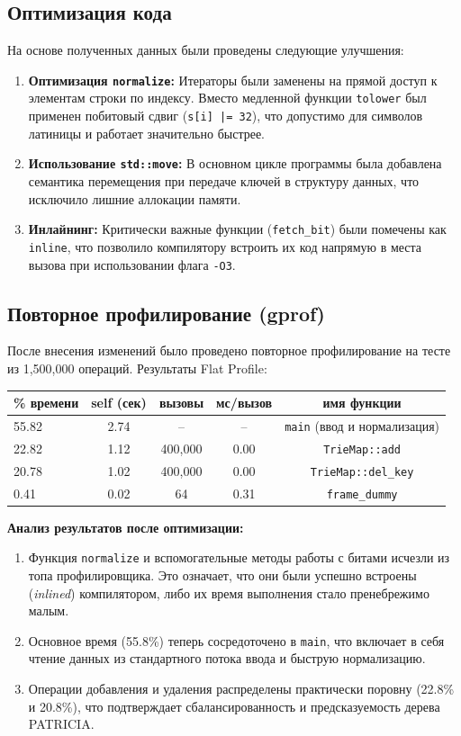 \documentclass[unicode, 12pt, a4paper,oneside,fleqn]{article}
\begin{document}
\subsection{Оптимизация кода}
На основе полученных данных были проведены следующие улучшения:
\begin{enumerate}
    \item \textbf{Оптимизация \texttt{normalize}:} Итераторы были заменены на прямой доступ к элементам строки по индексу. Вместо медленной функции \texttt{tolower} был применен побитовый сдвиг (\texttt{s[i] |= 32}), что допустимо для символов латиницы и работает значительно быстрее.
    \item \textbf{Использование \texttt{std::move}:} В основном цикле программы была добавлена семантика перемещения при передаче ключей в структуру данных, что исключило лишние аллокации памяти.
    \item \textbf{Инлайнинг:} Критически важные функции (\texttt{fetch\_bit}) были помечены как \texttt{inline}, что позволило компилятору встроить их код напрямую в места вызова при использовании флага \texttt{-O3}.
\end{enumerate}

\subsection{Повторное профилирование (gprof)}
После внесения изменений было проведено повторное профилирование на тесте из 1,500,000 операций. Результаты Flat Profile:

\begin{center}
\begin{tabular}{|l|c|c|c|c|}
\hline
\% времени & self (сек) & вызовы & мс/вызов & имя функции \\ \hline
55.82 & 2.74 & -- & -- & \texttt{main} (ввод и нормализация) \\ \hline
22.82 & 1.12 & 400,000 & 0.00 & \texttt{TrieMap::add} \\ \hline
20.78 & 1.02 & 400,000 & 0.00 & \texttt{TrieMap::del\_key} \\ \hline
0.41 & 0.02 & 64 & 0.31 & \texttt{frame\_dummy} \\ \hline
\end{tabular}
\end{center}

\textbf{Анализ результатов после оптимизации:}
\begin{enumerate}
    \item Функция \texttt{normalize} и вспомогательные методы работы с битами исчезли из топа профилировщика. Это означает, что они были успешно встроены (\textit{inlined}) компилятором, либо их время выполнения стало пренебрежимо малым.
    \item Основное время (55.8\%) теперь сосредоточено в \texttt{main}, что включает в себя чтение данных из стандартного потока ввода и быструю нормализацию.
    \item Операции добавления и удаления распределены практически поровну (22.8\% и 20.8\%), что подтверждает сбалансированность и предсказуемость дерева PATRICIA.
\end{enumerate}
\end{document}

